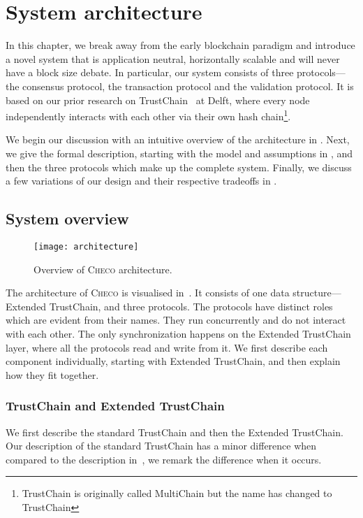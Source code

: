 \chapter{System architecture}
\label{ch:model}

In this chapter, we break away from the early blockchain paradigm and introduce a novel system that is application neutral,
horizontally scalable and will never have a block size debate.
In particular, our system consists of three protocols---the consensus protocol, the transaction protocol and the validation protocol.
It is based on our prior research on TrustChain~\cite{multichain} at Delft,
where every node independently interacts with each other via their own hash chain\footnote{TrustChain is originally called MultiChain but the name has changed to TrustChain}.

We begin our discussion with an intuitive overview of the architecture in .
Next, we give the formal description, starting with the model and assumptions in , 
and then the three protocols which make up the complete system.
Finally, we discuss a few variations of our design and their respective tradeoffs in .

\section{System overview}
\label{sec:system-overview}

\begin{figure}[h]
\centering
\texttt{[image: architecture]}
\caption{Overview of \textsc{Checo} architecture.}
\label{fig:architecture}
\end{figure}

The architecture of \textsc{Checo} is visualised in~.
It consists of one data structure---Extended TrustChain, and three protocols.
The protocols have distinct roles which are evident from their names.
They run concurrently and do not interact with each other.
The only synchronization happens on the Extended TrustChain layer, where all the protocols read and write from it.
We first describe each component individually, starting with Extended TrustChain, and then explain how they fit together.

\subsection*{TrustChain and Extended TrustChain}
We first describe the standard TrustChain and then the Extended TrustChain.
Our description of the standard TrustChain has a minor difference when compared to the description in~\cite{multichain},
we remark the difference when it occurs.


